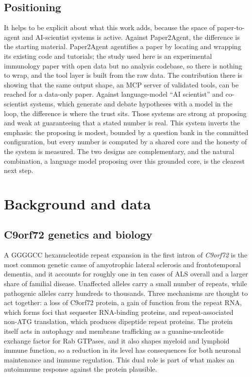 \documentclass[11pt]{article}
\begin{document}
\subsection{Positioning}
It helps to be explicit about what this work adds, because the space of paper-to-agent and
AI-scientist systems is active. Against Paper2Agent, the difference is the starting material. Paper2Agent
agentifies a paper by locating and wrapping its existing code and tutorials; the study used here is an
experimental immunology paper with open data but no analysis codebase, so there is nothing to wrap,
and the tool layer is built from the raw data. The contribution there is showing that the same output
shape, an MCP server of validated tools, can be reached for a data-only paper. Against language-model
``AI scientist'' and co-scientist systems, which generate and debate hypotheses with a model in the
loop, the difference is where the trust sits. Those systems are strong at proposing and weak at
guaranteeing that a stated number is real. This system inverts the emphasis: the proposing is modest,
bounded by a question bank in the committed configuration, but every number is computed by a shared
core and the honesty of the system is measured. The two designs are complementary,
and the natural combination, a language model proposing over this grounded core, is the clearest next
step.

\section{Background and data}
\subsection{C9orf72 genetics and biology}
A GGGGCC hexanucleotide repeat expansion in the first intron of \emph{C9orf72} is the most common
genetic cause of amyotrophic lateral sclerosis and frontotemporal dementia, and it accounts for
roughly one in ten cases of ALS overall and a larger share of familial disease. Unaffected alleles
carry a small number of repeats, while pathogenic alleles carry hundreds to thousands. Three
mechanisms are thought to act together: a loss of C9orf72 protein, a gain of function from the
repeat RNA, which forms foci that sequester RNA-binding proteins, and repeat-associated non-ATG
translation, which produces dipeptide repeat proteins. The protein itself acts in autophagy and
membrane trafficking as a guanine-nucleotide exchange factor for Rab GTPases, and it also shapes
myeloid and lymphoid immune function, so a reduction in its level has consequences for both
neuronal maintenance and immune regulation. This dual role is part of what makes an autoimmune
response against the protein plausible.
\end{document}

